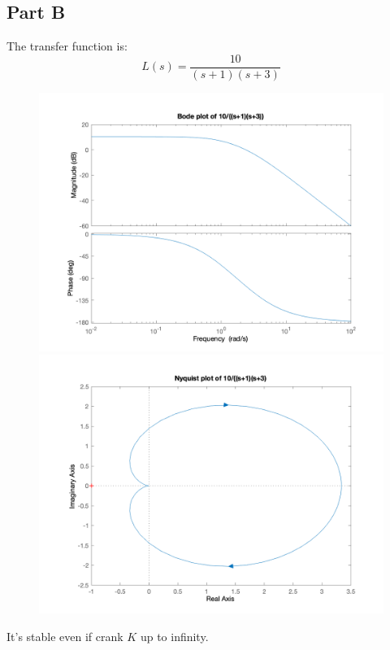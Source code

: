 \documentclass[a4paper]{article}
\begin{document}
\subsection{Part B} 
The transfer function is:
$$
L(s) = \frac{10}{(s+1)(s+3)}
$$
\begin{figure}[H]
\centering
\begin{minipage}[t]{0.48\textwidth}
\centering
\includegraphics[width=\textwidth]{pic/3.png}
\end{minipage}
\begin{minipage}[t]{0.48\textwidth}
\centering
\includegraphics[width=\textwidth]{pic/4.png}
\end{minipage}
\end{figure}
It's stable even if crank $K$ up to infinity.
\end{document}
